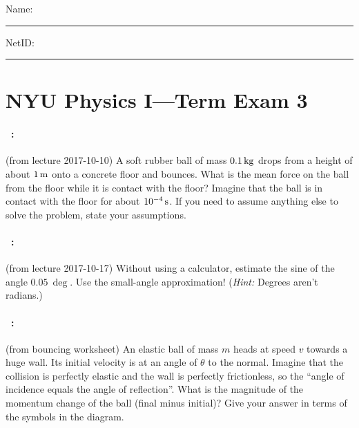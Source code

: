\documentclass[12pt]{article} 
\begin{document}
\noindent
Name: \rule[-1ex]{0.55\textwidth}{0.1pt}
NetID: \rule[-1ex]{0.2\textwidth}{0.1pt}

\section*{NYU Physics I---Term Exam 3}

\paragraph{\problemname~\theproblem:}%
(from lecture 2017-10-10)
A soft rubber ball of mass $0.1\,\mathrm{kg}$ drops from a height of about
$1\,\mathrm{m}$ onto a concrete floor and bounces. What is the mean force on
the ball from the floor while it is contact with the floor? Imagine
that the ball is in contact with the floor for about $10^{-4}\,\mathrm{s}$. If
you need to assume anything else to solve the problem, state your
assumptions.

\vfill

\paragraph{\problemname~\theproblem:}%
(from lecture 2017-10-17)
Without using a calculator, estimate the sine of the angle $0.05~\deg$.
Use the small-angle approximation! (\emph{Hint:} Degrees aren't radians.)

\vfill

\paragraph{\problemname~\theproblem:}%
(from bouncing worksheet)
An elastic ball of mass $m$ heads at speed $v$ towards a huge wall.
Its initial velocity is at an angle of $\theta$ to the normal.
Imagine that the collision is perfectly elastic and the
wall is perfectly frictionless, so the ``angle of incidence equals the
angle of reflection''. What is the magnitude of the momentum change of the ball (final
minus initial)?
Give your answer in terms of the symbols in the diagram.
\end{document}
